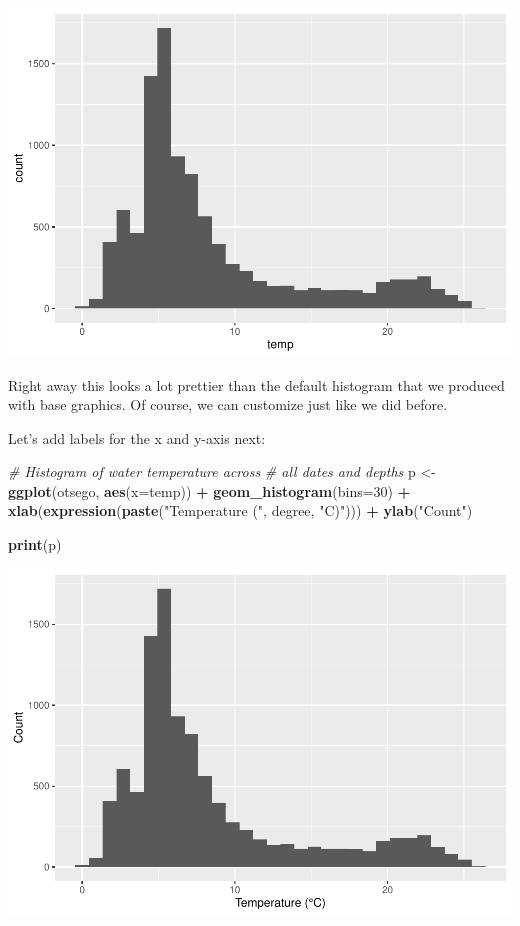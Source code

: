 \documentclass[
]{book}
\newenvironment{Shaded}{\begin{snugshade}}{\end{snugshade}}
\newcommand{\CommentTok}[1]{\textcolor[rgb]{0.56,0.35,0.01}{\textit{#1}}}
\newcommand{\DataTypeTok}[1]{\textcolor[rgb]{0.13,0.29,0.53}{#1}}
\newcommand{\DecValTok}[1]{\textcolor[rgb]{0.00,0.00,0.81}{#1}}
\newcommand{\KeywordTok}[1]{\textcolor[rgb]{0.13,0.29,0.53}{\textbf{#1}}}
\newcommand{\NormalTok}[1]{#1}
\newcommand{\OperatorTok}[1]{\textcolor[rgb]{0.81,0.36,0.00}{\textbf{#1}}}
\newcommand{\StringTok}[1]{\textcolor[rgb]{0.31,0.60,0.02}{#1}}
\begin{document}
\includegraphics{worstr_files/figure-latex/unnamed-chunk-99-1.pdf}

Right away this looks a lot prettier than the default histogram that we produced with base graphics. Of course, we can customize just like we did before.

Let's add labels for the x and y-axis next:

\begin{Shaded}
\begin{Highlighting}[]
\CommentTok{# Histogram of water temperature across }
\CommentTok{# all dates and depths}
\NormalTok{p <-}\StringTok{ }\KeywordTok{ggplot}\NormalTok{(otsego, }\KeywordTok{aes}\NormalTok{(}\DataTypeTok{x=}\NormalTok{temp)) }\OperatorTok{+}\StringTok{ }
\StringTok{  }\KeywordTok{geom_histogram}\NormalTok{(}\DataTypeTok{bins=}\DecValTok{30}\NormalTok{) }\OperatorTok{+}\StringTok{ }
\StringTok{  }\KeywordTok{xlab}\NormalTok{(}\KeywordTok{expression}\NormalTok{(}\KeywordTok{paste}\NormalTok{(}\StringTok{"Temperature ("}\NormalTok{, degree, }\StringTok{"C)"}\NormalTok{))) }\OperatorTok{+}
\StringTok{  }\KeywordTok{ylab}\NormalTok{(}\StringTok{"Count"}\NormalTok{)}

\KeywordTok{print}\NormalTok{(p)}
\end{Highlighting}
\end{Shaded}

\includegraphics{worstr_files/figure-latex/unnamed-chunk-100-1.pdf}
\end{document}
